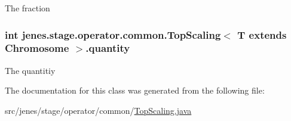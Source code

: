 The fraction \hypertarget{classjenes_1_1stage_1_1operator_1_1common_1_1_top_scaling_3_01_t_01extends_01_chromosome_01_4_a89dca8db478aefb4c249da3a7b75f0ad}{
\subsubsection[{quantity}]{\setlength{\rightskip}{0pt plus 5cm}int jenes.\-stage.\-operator.\-common.\-Top\-Scaling$<$ T extends Chromosome $>$.quantity\hspace{0.3cm}{\ttfamily [private]}}}\label{classjenes_1_1stage_1_1operator_1_1common_1_1_top_scaling_3_01_t_01extends_01_chromosome_01_4_a89dca8db478aefb4c249da3a7b75f0ad}
The quantitiy 

The documentation for this class was generated from the following file\-:\begin{DoxyCompactItemize}
\item 
src/jenes/stage/operator/common/\hyperlink{_top_scaling_8java}{Top\-Scaling.\-java}\end{DoxyCompactItemize}
